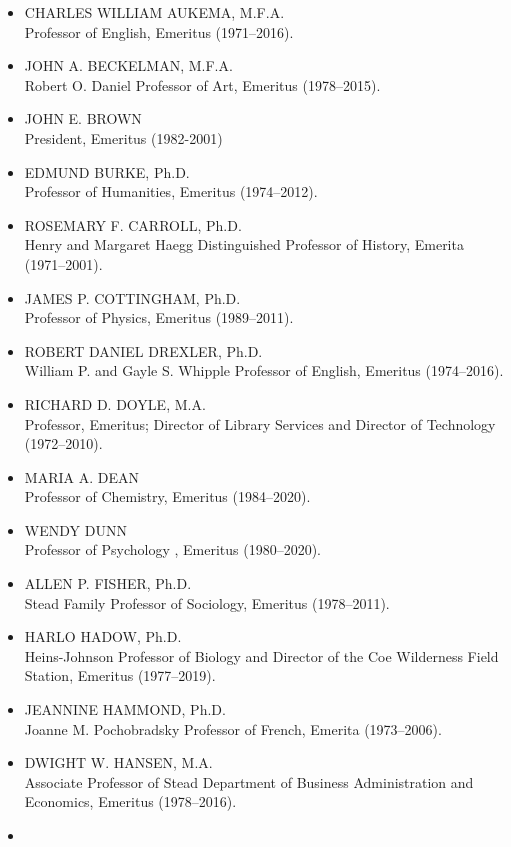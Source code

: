 \documentclass[
  letterpaper,
]{scrbook}
\begin{document}
\begin{itemize}
\item
  CHARLES WILLIAM AUKEMA, M.F.A.\\
  Professor of English, Emeritus (1971--2016).
\item
  JOHN A. BECKELMAN, M.F.A.\\
  Robert O. Daniel Professor of Art, Emeritus (1978--2015).
\item
  JOHN E. BROWN\\
  President, Emeritus (1982-2001)
\item
  EDMUND BURKE, Ph.D.\\
  Professor of Humanities, Emeritus (1974--2012).
\item
  ROSEMARY F. CARROLL, Ph.D.\\
  Henry and Margaret Haegg Distinguished Professor of History, Emerita
  (1971--2001).
\item
  JAMES P. COTTINGHAM, Ph.D.\\
  Professor of Physics, Emeritus (1989--2011).
\item
  ROBERT DANIEL DREXLER, Ph.D.\\
  William P. and Gayle S. Whipple Professor of English, Emeritus
  (1974--2016).
\item
  RICHARD D. DOYLE, M.A.\\
  Professor, Emeritus; Director of Library Services and Director of
  Technology (1972--2010).
\item
  MARIA A. DEAN\\
  Professor of Chemistry, Emeritus (1984--2020).
\item
  WENDY DUNN\\
  Professor of Psychology , Emeritus (1980--2020).
\item
  ALLEN P. FISHER, Ph.D.\\
  Stead Family Professor of Sociology, Emeritus (1978--2011).
\item
  HARLO HADOW, Ph.D.\\
  Heins-Johnson Professor of Biology and Director of the Coe Wilderness
  Field Station, Emeritus (1977--2019).
\item
  JEANNINE HAMMOND, Ph.D.\\
  Joanne M. Pochobradsky Professor of French, Emerita (1973--2006).
\item
  DWIGHT W. HANSEN, M.A.\\
  Associate Professor of Stead Department of Business Administration and
  Economics, Emeritus (1978--2016).
\item

\end{itemize}
\end{document}
